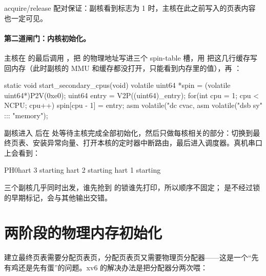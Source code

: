 
acquire/release 配对保证：副核看到标志为 1 时，主核在此之前写入的页表内容也一定可见。

\paragraph{第二道闸门：内核初始化。} 主核在  的最后调用 ，把  的物理地址写进三个 spin-table 槽，用  把这几行缓存写回内存（此时副核的 MMU 和缓存都没打开，只能看到内存里的值），再 ：

\begin{ccode}
static void start_secondary_cpus(void) {
  volatile uint64 *spin = (volatile uint64*)P2V(0xe0);
  uint64 entry = V2P((uint64)_entry);
  for(int cpu = 1; cpu < NCPU; cpu++){
    spin[cpu - 1] = entry;
    asm volatile("dc cvac, %
  }
  asm volatile("dsb sy\n\tsev" ::: "memory");
}
\end{ccode}

副核进入  后在  处等待主核完成全部初始化，然后只做每核相关的部分：切换到最终页表、安装异常向量、打开本核的定时器中断路由，最后进入调度器。真机串口上会看到：

\begin{txtcode}
PH0hart 3 starting
hart 2 starting
hart 1 starting
\end{txtcode}

三个副核几乎同时出发，谁先抢到  的锁谁先打印，所以顺序不固定； 是不经过锁的早期标记，会与其他输出交错。

\section{两阶段的物理内存初始化}

建立最终页表需要分配页表页，分配页表页又需要物理页分配器——这是一个“先有鸡还是先有蛋”的问题。xv6 的解决办法是把分配器分两次喂：


